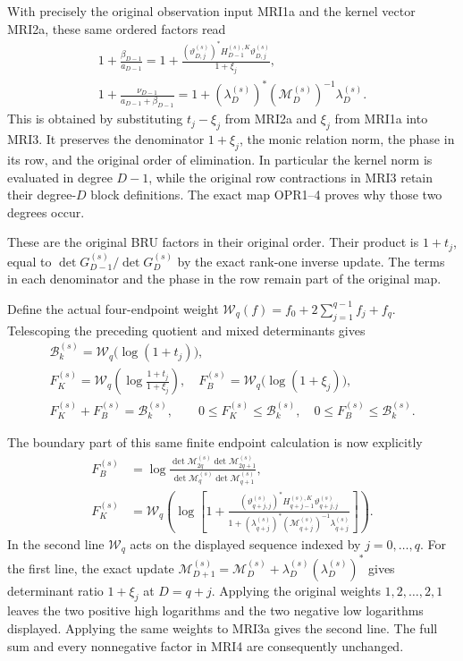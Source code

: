 \documentclass[11pt,a4paper]{article}
\begin{document}
With precisely the original observation input MRI1a and the
kernel vector MRI2a, these same ordered factors read
\[
\begin{gathered}
 1+\frac{\beta_{D-1}}{a_{D-1}}
   =1+\frac{(\vartheta_{D,j}^{(s)})^*
                  H_{D-1}^{(s),K}\vartheta_{D,j}^{(s)}}{1+\xi_j},\\
 1+\frac{\nu_{D-1}}{a_{D-1}+\beta_{D-1}}
   =1+(\lambda_D^{(s)})^*(\mathcal M_D^{(s)})^{-1}
                                              \lambda_D^{(s)}.
\end{gathered}\tag{MRI3a}
\]
This is obtained by substituting $t_j-\xi_j$ from MRI2a and
$\xi_j$ from MRI1a into MRI3. It preserves the denominator
$1+\xi_j$, the monic relation norm, the phase in its row, and
the original order of elimination. In particular the kernel
norm is evaluated in degree $D-1$, while the original row
contractions in MRI3 retain their degree-$D$ block definitions.
The exact map OPR1--4 proves why those two degrees occur.

These are the original BRU factors in their original order. Their
product is $1+t_j$, equal to
$\det G_{D-1}^{(s)}/\det G_D^{(s)}$ by the exact rank-one
inverse update. The terms in each denominator and the phase in
the row remain part of the original map.

Define the actual four-endpoint weight
$\mathcal W_q(f)=f_0+2\sum_{j=1}^{q-1}f_j+f_q$. Telescoping
the preceding quotient and mixed determinants gives
\[
\begin{gathered}
 \mathcal B_k^{(s)}=\mathcal W_q\bigl(\log(1+t_j)\bigr),\\
 F_K^{(s)}=\mathcal W_q\left(\log\frac{1+t_j}{1+\xi_j}\right),
 \quad F_B^{(s)}=\mathcal W_q\bigl(\log(1+\xi_j)\bigr),\\
 F_K^{(s)}+F_B^{(s)}=\mathcal B_k^{(s)},\qquad
 0\le F_K^{(s)}\le\mathcal B_k^{(s)},\quad
 0\le F_B^{(s)}\le\mathcal B_k^{(s)}.
\end{gathered}\tag{MRI4}
\]

The boundary part of this same finite endpoint calculation is
now explicitly
\[
\begin{split}
 F_B^{(s)}
 &=\log\frac{\det\mathcal M_{2q}^{(s)}
                  \det\mathcal M_{2q+1}^{(s)}}
                 {\det\mathcal M_q^{(s)}
                  \det\mathcal M_{q+1}^{(s)}},\\
 F_K^{(s)}
 &=\mathcal W_q\left(\log\left[1+
       \frac{(\vartheta_{q+j,j}^{(s)})^*
                H_{q+j-1}^{(s),K}\vartheta_{q+j,j}^{(s)}}
            {1+(\lambda_{q+j}^{(s)})^*
                (\mathcal M_{q+j}^{(s)})^{-1}\lambda_{q+j}^{(s)}}
                                    \right]\right).
\end{split}\tag{MRI4a}
\]
In the second line $\mathcal W_q$ acts on the displayed sequence
indexed by $j=0,\ldots,q$. For the first line, the exact update
$\mathcal M_{D+1}^{(s)}=\mathcal M_D^{(s)}
+\lambda_D^{(s)}(\lambda_D^{(s)})^*$ gives determinant ratio
$1+\xi_j$ at $D=q+j$. Applying the original weights
$1,2,\ldots,2,1$ leaves the two positive high logarithms and
the two negative low logarithms displayed. Applying the same
weights to MRI3a gives the second line. The full sum and every
nonnegative factor in MRI4 are consequently unchanged.
\end{document}
